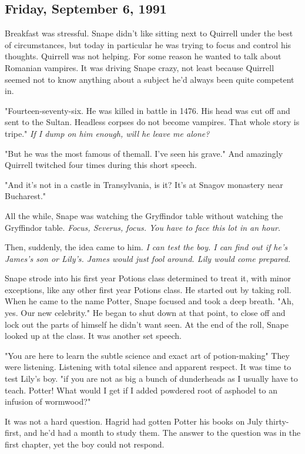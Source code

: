 \subsection{Friday, September 6, 1991}

Breakfast was stressful. Snape didn't like sitting next to Quirrell under the best of circumstances, but today in particular he was trying to focus and control his thoughts. Quirrell was not helping. For some reason he wanted to talk about Romanian vampires. It was driving Snape crazy, not least because Quirrell seemed not to know anything about a subject he'd always been quite competent in.

"Fourteen-seventy-six. He was killed in battle in 1476. His head was cut off and sent to the Sultan. Headless corpses do not become vampires. That whole story is tripe." \emph{If I dump on him enough, will he leave me alone?}

"{\el}But he was the{\el} most famous of them{\el}all. I've{\el} seen his{\el} grave." And amazingly Quirrell twitched four times during this short speech.

"And it's not in a castle in Transylvania, is it? It's at Snagov monastery near Bucharest."

All the while, Snape was watching the Gryffindor table without watching the Gryffindor table. \emph{Focus, Severus, focus. You have to face this lot in an hour.}

Then, suddenly, the idea came to him. \emph{I can test the boy. I can find out if he's James's son or Lily's. James would just fool around. Lily would come prepared.}

Snape strode into his first year Potions class determined to treat it, with minor exceptions, like any other first year Potions class. He started out by taking roll. When he came to the name Potter, Snape focused and took a deep breath. "Ah, yes. Our new celebrity." He began to shut down at that point, to close off and lock out the parts of himself he didn't want seen. At the end of the roll, Snape looked up at the class. It was another set speech.

"You are here to learn the subtle science and exact art of potion-making{\el}" They were listening. Listening with total silence and apparent respect. It was time to test Lily's boy. "{\el}if you are not as big a bunch of dunderheads as I usually have to teach. Potter! What would I get if I added powdered root of asphodel to an infusion of wormwood?"

It was not a hard question. Hagrid had gotten Potter his books on July thirty-first, and he'd had a month to study them. The answer to the question was in the first chapter, yet the boy could not respond.

